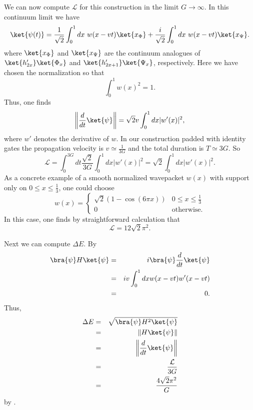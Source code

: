 \documentclass[11pt]{article}
\begin{document}
We can now compute $\mathcal{L}$ for this construction in the limit $G \to \infty$. In this continuum limit we have
\begin{equation}
\label{contin}
\ket{\psi(t)} = \frac{1}{\sqrt{2}} \int_0^1 dx \ w(x-vt) \ket{x_\Phi} + \frac{i}{\sqrt{2}} \int_0^1 dx \ w(x-vt) \ket{x_\Psi}.
\end{equation}
where $\ket{x_\Phi}$ and $\ket{x_\Psi}$ are the continuum analogues of $\ket{h'_{2x}}\ket{\Phi_x}$ and $\ket{h'_{2x+1}}\ket{\Psi_x}$, respectively. Here we have chosen the normalization so that
\begin{equation}
\int_0^1 w(x)^2 = 1.
\end{equation}
Thus, one finds
\begin{equation}
\left\| \frac{d}{dt} \ket{\psi} \right\| = \sqrt{2} v \int_0^1 dx |w'(x)|^2,
\end{equation}
where $w'$ denotes the derivative of $w$. In our construction padded with identity gates the propagation velocity is $v \simeq \frac{1}{3G}$ and the total duration is $T \simeq 3G$. So
\begin{equation}
\mathcal{L} = \int_0^{3G} dt \frac{\sqrt{2}}{3G} \int_0^1 dx |w'(x)|^2 = \sqrt{2} \int_0^1 dx |w'(x)|^2.
\end{equation}
As a concrete example of a smooth normalized wavepacket $w(x)$ with support only on $0 \leq x \leq \frac{1}{3}$, one could choose
\begin{equation}
w(x) = \left\{ \begin{array}{cl} \sqrt{2} \left( 1 - \cos(6 \pi x) \right) & 0 \leq x \leq \frac{1}{3} \\
0 & \textrm{otherwise}. \end{array} \right.
\end{equation}
In this case, one finds by straightforward calculation that
\begin{equation}
\label{lval}
\mathcal{L} = 12 \sqrt{2} \pi^2.
\end{equation}

Next we can compute $\Delta E$. By 
\begin{eqnarray}
\bra{\psi} H \ket{\psi} & = & i \bra{\psi} \frac{d}{dt} \ket{\psi} \\
 & = & i v \int_0^1 dx w(x-vt) w'(x-vt)\\
 & = & 0.
\end{eqnarray}
Thus,
\begin{eqnarray}
\Delta E & = & \sqrt{\bra{\psi} H^2 \ket{\psi}} \\
 & = & \| H \ket{\psi} \| \\
 & = & \left\| \frac{d}{dt} \ket{\psi} \right\| \\
 & = & \frac{\mathcal{L}}{3G} \\
 & = & \frac{4 \sqrt{2} \pi^2}{G}
\end{eqnarray}
by .
\end{document}
